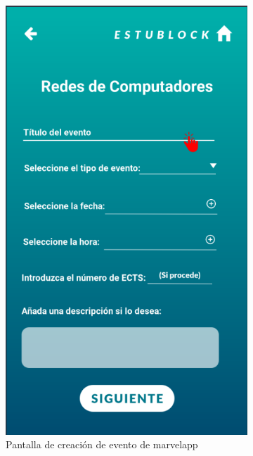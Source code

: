 \begin{figure}[hbt]
	\centering
	\begin{subfigure}[b]{0.4\linewidth}
		\centering
        \includegraphics[width=0.7\linewidth]{figs/Desarrollo/Interfaz/marvel_crear_evento}
        \caption[Marvel Crear Evento]{Pantalla de creación de evento de marvelapp}
	\end{subfigure} 
	\begin{subfigure}[b]{0.4\linewidth}
		\centering

\end{subfigure}
\end{figure}

